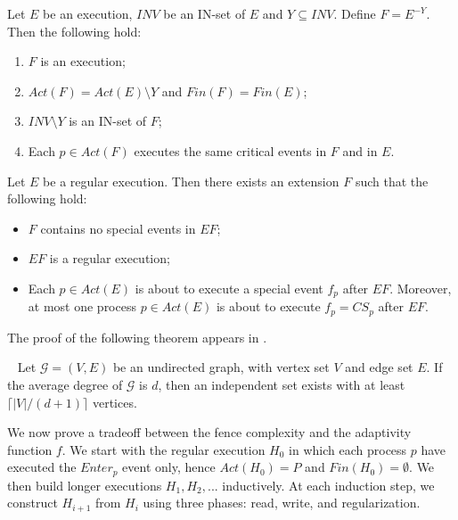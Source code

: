 \begin{lemma} \label{lem: remove-invisibale-processes}
	Let $E$ be an execution, $\mathit{INV}$ be an IN-set of $E$ and $Y \subseteq \mathit{INV}$.
	\newline Define $F = E^{-Y}$. Then the following hold:
	\begin{enumerate}
		\item $F$ is an execution;
		\item $Act(F) = Act(E) \setminus Y$ and $Fin(F) = Fin(E)$;
		\item $\mathit{INV} \setminus Y$ is an IN-set of $F$;
		\item Each $p \in Act(F)$ executes the same critical events in $F$ and in $E$.
	\end{enumerate}
\end{lemma}

\begin{lemma} \label{lem: next-critical-extension}
	Let $E$ be a regular execution. Then there exists an extension $F$ such that the following hold:
	\begin{itemize}
		\item $F$ contains no special events in $E F$;
		\item $E F$ is a regular execution;
		\item Each $p \in Act(E)$ is about to execute a special event $f_p$ after $E F$. Moreover, at most one process $p \in Act(E)$ is about to execute $f_p=CS_p$ after $E F$.
	\end{itemize}
\end{lemma}

The proof of the following theorem appears in \cite{Bollobas2004}.

\begin{theorem} [Tur\'{a}n] ~\label{th: turan}
	Let $\mathcal{G} = (V,E)$ be an undirected graph, with vertex set $V$ and edge set $E$. If the average degree of $\mathcal{G}$ is $d$, then an independent set exists with at least $\lceil |V|/(d+1) \rceil$ vertices.
\end{theorem}
	
We now prove a tradeoff between the fence complexity and the adaptivity function $f$.
We start with the regular execution $H_0$ in which each process $p$ have executed the $Enter_p$ event only, hence $Act(H_0)=P$ and $Fin(H_0)=\emptyset$. We then build longer executions $H_1,H_2,...$ inductively. At each induction step, we construct $H_{i+1}$ from $H_i$ using three phases: read, write, and regularization.

